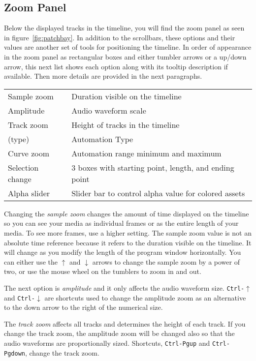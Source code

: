 \subsection{Zoom Panel}%
\label{sub:zoom_panel}

Below the displayed tracks in the timeline, you will find the zoom panel as seen in figure~\ref{fig:patchbay}.
In addition to the scrollbars, these options and their values are another set of tools for positioning the timeline.  
In order of appearance in the zoom panel as rectangular boxes and either tumbler arrows or a up/down arrow, this next list shows each option along with its tooltip description if available.
Then more details are provided in the next paragraphs.

\vspace{2ex}
\begin{tabular}{ll}
   \hline
	Sample zoom & Duration visible on the timeline \\
	Amplitude & Audio waveform scale \\
	Track zoom & Height of tracks in the timeline \\
	  (type) & Automation Type \\
	Curve zoom & Automation range minimum and maximum \\
	Selection change & 3 boxes with starting point, length, and ending point \\
	Alpha slider & Slider bar to control alpha value for colored assets \\
   \hline
\end{tabular}

Changing the \emph{sample zoom} changes the amount of time displayed on the timeline 
so you can see your media as individual frames or as the entire length of your media. 
To see more frames, use a higher setting. 
The sample zoom value is not an absolute time reference because it refers to the duration visible on the timeline. It will change as you modify the length of the program window horizontally.
You can either use the $\uparrow$ and $\downarrow$ arrows to change the sample zoom by a power of two, or use the mouse wheel on the tumblers to zoom in and out.


The next option is \emph{amplitude} and it only affects the audio waveform size. \texttt{Ctrl-$\uparrow$} and \texttt{Ctrl-$\downarrow$} are shortcuts used to change the amplitude zoom as an alternative to the down arrow to the right of the numerical size.

The \emph{track zoom} affects all tracks and determines the height of each track. 
If you change the track zoom, the amplitude zoom will be changed also so that the audio waveforms
are proportionally sized.
Shortcuts, \texttt{Ctrl-Pgup} and \texttt{Ctrl-Pgdown}, change the track zoom.

